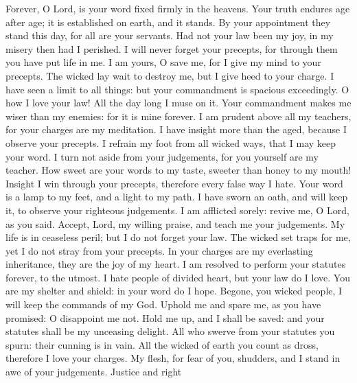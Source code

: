  Forever, O Lord, is your word fixed firmly in the heavens.
 Your truth endures age after age; it is established on
earth, and it stands.  By your appointment they stand this
day, for all are your servants.  Had not your law been my
joy, in my misery then had I perished.  I will never forget
your precepts, for through them you have put life in me.  I
am yours, O save me, for I give my mind to your precepts. 
The wicked lay wait to destroy me, but I give heed to your charge.
 I have seen a limit to all things: but your commandment is
spacious exceedingly.  O how I love your law! All the day
long I muse on it.  Your commandment makes me wiser than my
enemies: for it is mine forever.  I am prudent above all my
teachers, for your charges are my meditation.  I have
insight more than the aged, because I observe your precepts.
 I refrain my foot from all wicked ways, that I may keep
your word.  I turn not aside from your judgements, for you
yourself are my teacher.  How sweet are your words to my
taste, sweeter than honey to my mouth!  Insight I win
through your precepts, therefore every false way I hate. 
Your word is a lamp to my feet, and a light to my path.  I
have sworn an oath, and will keep it, to observe your righteous
judgements.  I am afflicted sorely: revive me, O Lord, as
you said.  Accept, Lord, my willing praise, and teach me
your judgements.  My life is in ceaseless peril; but I do
not forget your law.  The wicked set traps for me, yet I
do not stray from your precepts.  In your charges are my
everlasting inheritance, they are the joy of my heart.  I
am resolved to perform your statutes forever, to the utmost.
 I hate people of divided heart, but your law do I love.
 You are my shelter and shield: in your word do I hope.
 Begone, you wicked people, I will keep the commands of my
God.  Uphold me and spare me, as you have promised: O
disappoint me not.  Hold me up, and I shall be saved: and
your statutes shall be my unceasing delight.  All who
swerve from your statutes you spurn: their cunning is in vain.
 All the wicked of earth you count as dross, therefore I
love your charges.  My flesh, for fear of you, shudders,
and I stand in awe of your judgements.  Justice and right
